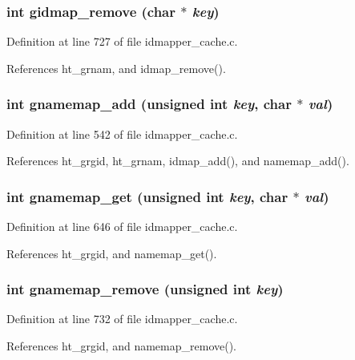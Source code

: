 \subsubsection{\setlength{\rightskip}{0pt plus 5cm}int gidmap\_\-remove (char $\ast$ {\em key})}\label{idmapper__cache_8c_a35}




Definition at line 727 of file idmapper\_\-cache.c.

References ht\_\-grnam, and idmap\_\-remove().
\subsubsection{\setlength{\rightskip}{0pt plus 5cm}int gnamemap\_\-add (unsigned int {\em key}, char $\ast$ {\em val})}\label{idmapper__cache_8c_a24}




Definition at line 542 of file idmapper\_\-cache.c.

References ht\_\-grgid, ht\_\-grnam, idmap\_\-add(), and namemap\_\-add().
\subsubsection{\setlength{\rightskip}{0pt plus 5cm}int gnamemap\_\-get (unsigned int {\em key}, char $\ast$ {\em val})}\label{idmapper__cache_8c_a30}




Definition at line 646 of file idmapper\_\-cache.c.

References ht\_\-grgid, and namemap\_\-get().
\subsubsection{\setlength{\rightskip}{0pt plus 5cm}int gnamemap\_\-remove (unsigned int {\em key})}\label{idmapper__cache_8c_a36}




Definition at line 732 of file idmapper\_\-cache.c.

References ht\_\-grgid, and namemap\_\-remove().
